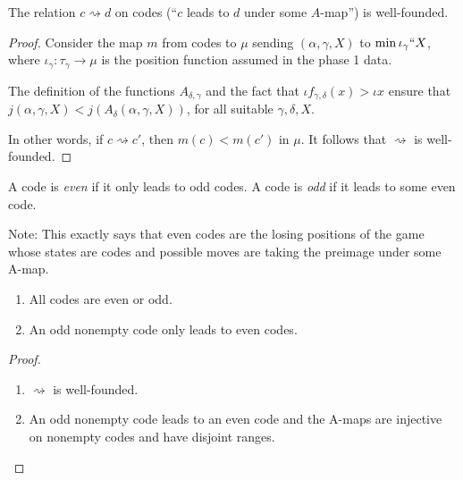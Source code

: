 \begin{lemma}
\label{lem:a-map-wf}
\leanok
The relation $c \rightsquigarrow d$ on codes (“$c$ leads to $d$ under some $A$-map”) is well-founded.
\end{lemma}

\begin{proof}
\leanok
  Consider the map $m$ from codes to $\mu$ sending $(\alpha,\gamma,X)$ to $\min \iota_\gamma``X$, where $\iota_\gamma : \tau_\gamma \to \mu$ is the position function assumed in the phase 1 data.

  The definition of the functions $A_{\delta,\gamma}$ and the fact that $\iota f_{\gamma,\delta}(x) > \iota x $ ensure that $j(\alpha,\gamma,X) < j(A_\delta(\alpha,\gamma,X))$, for all suitable $\gamma,\delta,X$.

  In other words, if $c \rightsquigarrow c'$, then $m(c) < m(c')$ in $\mu$.  It follows that $\rightsquigarrow$ is well-founded.
\end{proof}

\begin{definition}
\label {def:code-parity}
\leanok
A code is \emph{even} if it only leads to odd codes. A code is \emph{odd} if it leads to some even code.

Note: This exactly says that even codes are the losing positions of the game whose states are codes
and possible moves are taking the preimage under some A-map.
\end{definition}

\begin{lemma}
\label {lem:code-parity-properties}
\leanok
\begin{enumerate}
\item All codes are even or odd.
\item An odd nonempty code only leads to even codes.
\end{enumerate}
\end{lemma}
\begin{proof}
\leanok
\begin{enumerate}
\item $\rightsquigarrow$ is well-founded.
\item An odd nonempty code leads to an even code and the A-maps are injective on nonempty codes and have disjoint ranges.
\end{enumerate}
\end{proof}

